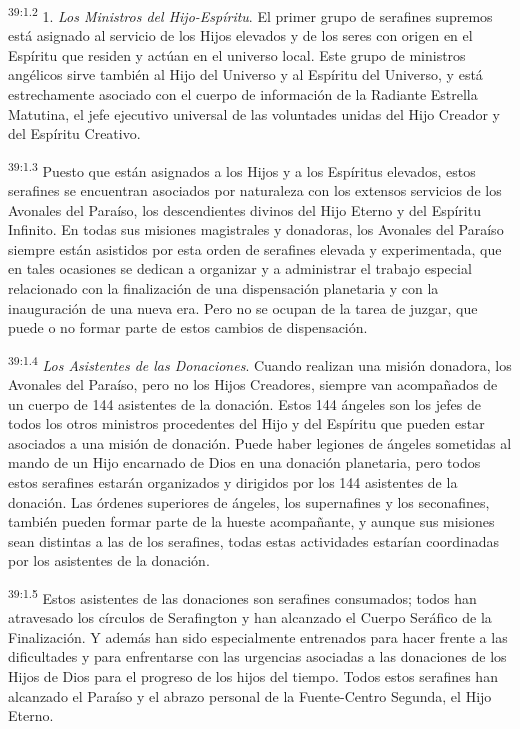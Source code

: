 \par
\textsuperscript{39:1.2} 1. \textit{Los Ministros del Hijo-Espíritu}. El primer grupo de serafines supremos está asignado al servicio de los Hijos elevados y de los seres con origen en el Espíritu que residen y actúan en el universo local. Este grupo de ministros angélicos sirve también al Hijo del Universo y al Espíritu del Universo, y está estrechamente asociado con el cuerpo de información de la Radiante Estrella Matutina, el jefe ejecutivo universal de las voluntades unidas del Hijo Creador y del Espíritu Creativo.

\par
\textsuperscript{39:1.3} Puesto que están asignados a los Hijos y a los Espíritus elevados, estos serafines se encuentran asociados por naturaleza con los extensos servicios de los Avonales del Paraíso, los descendientes divinos del Hijo Eterno y del Espíritu Infinito. En todas sus misiones magistrales y donadoras, los Avonales del Paraíso siempre están asistidos por esta orden de serafines elevada y experimentada, que en tales ocasiones se dedican a organizar y a administrar el trabajo especial relacionado con la finalización de una dispensación planetaria y con la inauguración de una nueva era. Pero no se ocupan de la tarea de juzgar, que puede o no formar parte de estos cambios de dispensación.

\par
\textsuperscript{39:1.4} \textit{Los Asistentes de las Donaciones}. Cuando realizan una misión donadora, los Avonales del Paraíso, pero no los Hijos Creadores, siempre van acompañados de un cuerpo de 144 asistentes de la donación. Estos 144 ángeles son los jefes de todos los otros ministros procedentes del Hijo y del Espíritu que pueden estar asociados a una misión de donación. Puede haber legiones de ángeles sometidas al mando de un Hijo encarnado de Dios en una donación planetaria, pero todos estos serafines estarán organizados y dirigidos por los 144 asistentes de la donación. Las órdenes superiores de ángeles, los supernafines y los seconafines, también pueden formar parte de la hueste acompañante, y aunque sus misiones sean distintas a las de los serafines, todas estas actividades estarían coordinadas por los asistentes de la donación.

\par
\textsuperscript{39:1.5} Estos asistentes de las donaciones son serafines consumados; todos han atravesado los círculos de Serafington y han alcanzado el Cuerpo Seráfico de la Finalización. Y además han sido especialmente entrenados para hacer frente a las dificultades y para enfrentarse con las urgencias asociadas a las donaciones de los Hijos de Dios para el progreso de los hijos del tiempo. Todos estos serafines han alcanzado el Paraíso y el abrazo personal de la Fuente-Centro Segunda, el Hijo Eterno.

